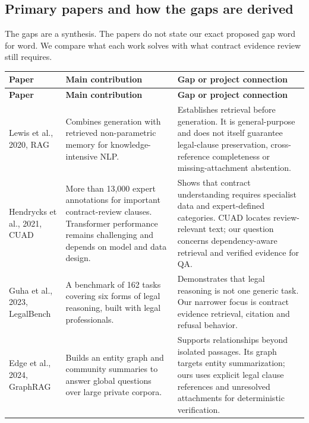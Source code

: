 \documentclass[11pt,letterpaper]{article}
\begin{document}
\subsection{Primary papers and how the gaps are derived}
The gaps are a synthesis. The papers do not state our exact proposed gap word for word. We compare what each work solves with what contract evidence review still requires.
\begin{longtable}{>{\raggedright\arraybackslash}p{}>{\raggedright\arraybackslash}p{}>{\raggedright\arraybackslash}p{}}
\toprule
\textbf{Paper} & \textbf{Main contribution} & \textbf{Gap or project connection}\\
\midrule
\endfirsthead
\toprule
\textbf{Paper} & \textbf{Main contribution} & \textbf{Gap or project connection}\\
\midrule
\endhead
Lewis et al., 2020, RAG & Combines generation with retrieved non-parametric memory for knowledge-intensive NLP. & Establishes retrieval before generation. It is general-purpose and does not itself guarantee legal-clause preservation, cross-reference completeness or missing-attachment abstention.\\
\addlinespace
Hendrycks et al., 2021, CUAD & More than 13,000 expert annotations for important contract-review clauses. Transformer performance remains challenging and depends on model and data design. & Shows that contract understanding requires specialist data and expert-defined categories. CUAD locates review-relevant text; our question concerns dependency-aware retrieval and verified evidence for QA.\\
\addlinespace
Guha et al., 2023, LegalBench & A benchmark of 162 tasks covering six forms of legal reasoning, built with legal professionals. & Demonstrates that legal reasoning is not one generic task. Our narrower focus is contract evidence retrieval, citation and refusal behavior.\\
\addlinespace
Edge et al., 2024, GraphRAG & Builds an entity graph and community summaries to answer global questions over large private corpora. & Supports relationships beyond isolated passages. Its graph targets entity summarization; ours uses explicit legal clause references and unresolved attachments for deterministic verification.\\
\bottomrule
\end{longtable}
\end{document}
